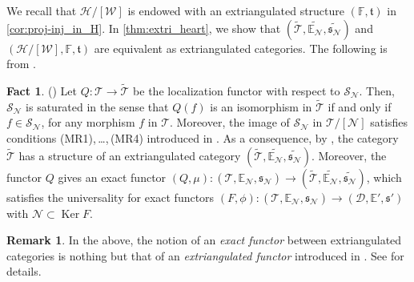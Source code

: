 \documentclass[a4paper,reqno,10pt]{amsart}
\DeclareRobustCommand{\darkblueedit}[1]{#1}
\theoremstyle{definition}
\theoremstyle{definition}
\newtheorem{remark}[remark]{Remark}
\theoremstyle{definition}
\newtheorem{fact}[fact]{Fact}
\theoremstyle{definition}
\theoremstyle{plain}
\newcommand{\Ker}{\operatorname{Ker}}
\newcommand{\fs}{\mathfrak{s}}
\newcommand{\ft}{\mathfrak{t}}
\newcommand{\BE}{\mathbb{E}}
\newcommand{\BF}{\mathbb{F}}
\newcommand{\CD}{\mathcal{D}}
\newcommand{\CH}{\mathcal{H}}
\newcommand{\CN}{\mathcal{N}}
\newcommand{\CT}{\mathcal{T}}
\newcommand{\CW}{\mathcal{W}}
\renewcommand{\SS}{\mathscr{S}}
\begin{document}
We recall that $\CH/[\CW]$ is endowed with an extriangulated structure $(\BF,\ft)$ in \cref{cor:proj-inj_in_H}.
\color{blue}
In \cref{thm:extri_heart}, we show that $(\widetilde{\CT},\widetilde{\BE_{\CN}},\widetilde{\fs_{\CN}})$ and $(\CH/[\CW],\BF,\ft)$ \darkblueedit{are equivalent} as extriangulated categories.
\color{blue}
The following is from \cite{Oga24}.
\normalcolor
\begin{fact}\label{fact:Thm2.20}(\cite[Proposition~2.17, Theorem~2.20]{Oga24})
\color{blue}
Let $Q\colon\CT\to\widetilde{\CT}$ be the localization functor with respect to $\SS_{\CN}$.
Then, $\SS_{\CN}$ is saturated in the sense that $Q(f)$ is an isomorphism in $\widetilde{\CT}$ if and only if $f\in\SS_{\CN}$, for any morphism $f$ in $\CT$. 
Moreover, the image of $\SS_{\CN}$ in $\CT/[\CN]$
\normalcolor
satisfies conditions {\rm (MR1)},\,\ldots,\,{\rm (MR4)} introduced in \cite{NOS22}. As a consequence, 
\color{blue}
by \cite[Theorem~3.5]{NOS22}, the category $\widetilde{\CT}$ has a structure of an extriangulated category $(\widetilde{\CT},\widetilde{\BE_{\CN}},\widetilde{\fs_{\CN}})$. Moreover, the functor $Q$ gives an exact functor $(Q,\mu)\colon(\CT,\BE_{\CN},\fs_{\CN})\to(\widetilde{\CT},\widetilde{\BE_{\CN}},\widetilde{\fs_{\CN}})$, which satisfies the universality for exact functors $(F,\phi)\colon(\CT,\BE_{\CN},\fs_{\CN})\to(\CD,\BE',\fs')$ with $\CN\subset\Ker F$.
\color{blue}
\normalcolor
\end{fact}

\color{blue}
\begin{remark}
In the above, the notion of an \emph{exact functor} between extriangulated categories is nothing but that of an \emph{extriangulated functor} introduced in \cite[Definition~2.23]{B-TS21}. See \cite[Definition~2.11 and Remark~2.12]{NOS22} for details.
\end{remark}
\end{document}
